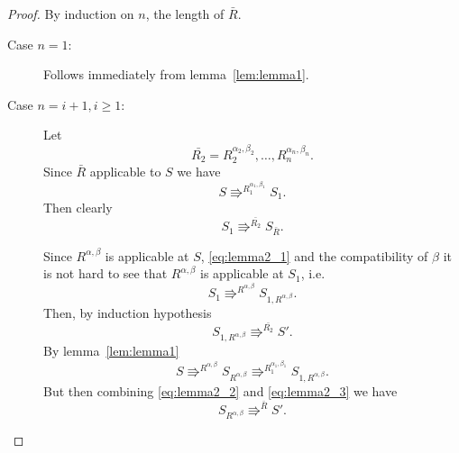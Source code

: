 \begin{proof}
  By induction on $n$, the length of $\bar{R}$.
  \begin{description}
    \item[Case $n = 1$:] Follows immediately from lemma~\ref{lem:lemma1}.
    \item[Case $n = i+1, i \geq 1$:] Let
      \begin{equation*}
        \bar{R_2} = R_2^{\alpha_2, \beta_2}, \dots, R_n^{\alpha_n, \beta_n}.
      \end{equation*}
      Since $\bar{R}$ applicable to $S$ we have 
      \begin{equation}
        S \Rrightarrow^{R_1^{\alpha_1, \beta_1}} S_1.
      \end{equation}
      Then clearly
      \begin{equation}
        S_1 \Rrightarrow^{\bar{R_2}} S_{\bar{R}}.
      \end{equation}
      
      Since $R^{\alpha, \beta}$ is applicable at $S$, \eqref{eq:lemma2_1} and
      the compatibility of $\beta$ it is not hard to see that
      $R^{\alpha, \beta}$ is applicable at $S_1$, i.e.
      \begin{equation}
        S_1 \Rrightarrow^{R^{\alpha, \beta}} S_{1,R^{\alpha, \beta}}.
      \end{equation}
      Then, by induction hypothesis
      \begin{equation} \label{eq:lemma2_2}
        S_{1,R^{\alpha, \beta}} \Rrightarrow^{\bar{R_2}} S'.
      \end{equation}
      By lemma~\ref{lem:lemma1} 
      \begin{equation} \label{eq:lemma2_3}
        S \Rrightarrow^{R^{\alpha, \beta}} S_{R^{\alpha, \beta}}
        \Rrightarrow^{R_1^{\alpha_1, \beta_1}} S_{1, R^{\alpha, \beta}}.
      \end{equation}
      But then combining \eqref{eq:lemma2_2} and \eqref{eq:lemma2_3} we have
      \begin{equation}
        S_{R^{\alpha, \beta}} \Rrightarrow^{\bar{R}} S'.
      \end{equation}
  \end{description}
\end{proof}


